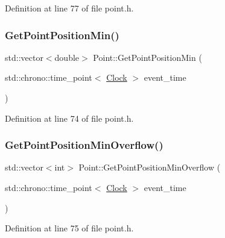 Definition at line 77 of file point.\+h.

\mbox{\label{class_point_a6182865226595813eccadbe25d38cd9e}} 
\subsubsection{\texorpdfstring{Get\+Point\+Position\+Min()}{GetPointPositionMin()}}
{\footnotesize\ttfamily std\+::vector$<$double$>$ Point\+::\+Get\+Point\+Position\+Min (\begin{DoxyParamCaption}\item[{std\+::chrono\+::time\+\_\+point$<$ \mbox{\hyperlink{universe_8h_a0ef8d951d1ca5ab3cfaf7ab4c7a6fd80}{Clock}} $>$}]{event\+\_\+time }\end{DoxyParamCaption})\hspace{0.3cm}{\ttfamily [inline]}}



Definition at line 74 of file point.\+h.

\mbox{\label{class_point_a3a0caf079555585799754b3cab12129c}} 
\subsubsection{\texorpdfstring{Get\+Point\+Position\+Min\+Overflow()}{GetPointPositionMinOverflow()}}
{\footnotesize\ttfamily std\+::vector$<$int$>$ Point\+::\+Get\+Point\+Position\+Min\+Overflow (\begin{DoxyParamCaption}\item[{std\+::chrono\+::time\+\_\+point$<$ \mbox{\hyperlink{universe_8h_a0ef8d951d1ca5ab3cfaf7ab4c7a6fd80}{Clock}} $>$}]{event\+\_\+time }\end{DoxyParamCaption})\hspace{0.3cm}{\ttfamily [inline]}}



Definition at line 75 of file point.\+h.

\mbox{\label{class_point_acdd393f39d8c08aff1e866ce1c5585e5}} 
